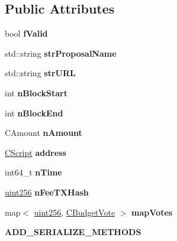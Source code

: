 \subsection*{Public Attributes}
\begin{DoxyCompactItemize}
\item 
\mbox{\label{class_c_budget_proposal_ab2222fd5e4fc51881d82b9c7dc6a0f10}} 
bool {\bfseries f\+Valid}
\item 
\mbox{\label{class_c_budget_proposal_ab881106333b75bf1a8c5c97d56cd6703}} 
std\+::string {\bfseries str\+Proposal\+Name}
\item 
\mbox{\label{class_c_budget_proposal_ac6ff1965ce0dca34221ec041ae831e83}} 
std\+::string {\bfseries str\+U\+RL}
\item 
\mbox{\label{class_c_budget_proposal_a40a5d7e56c5ef1636b48bb67e6619e32}} 
int {\bfseries n\+Block\+Start}
\item 
\mbox{\label{class_c_budget_proposal_a384863d009b95fd48d50f41891e41840}} 
int {\bfseries n\+Block\+End}
\item 
\mbox{\label{class_c_budget_proposal_ad40f0d2ff6c0bef605d405fbcb36136c}} 
C\+Amount {\bfseries n\+Amount}
\item 
\mbox{\label{class_c_budget_proposal_abec3e0b5b46ac1a8aad65b4144b87782}} 
\mbox{\hyperlink{class_c_script}{C\+Script}} {\bfseries address}
\item 
\mbox{\label{class_c_budget_proposal_a73bbfda4189ae03fdecc3d6ddf984a42}} 
int64\+\_\+t {\bfseries n\+Time}
\item 
\mbox{\label{class_c_budget_proposal_aba9937f0c86385b04d0fd5eb136ce999}} 
\mbox{\hyperlink{classuint256}{uint256}} {\bfseries n\+Fee\+T\+X\+Hash}
\item 
\mbox{\label{class_c_budget_proposal_a83239972ab9db545206ac7e59740bfab}} 
map$<$ \mbox{\hyperlink{classuint256}{uint256}}, \mbox{\hyperlink{class_c_budget_vote}{C\+Budget\+Vote}} $>$ {\bfseries map\+Votes}
\item 
\mbox{\label{class_c_budget_proposal_ad35aca18a74a65dd6df2a04536253174}} 
{\bfseries A\+D\+D\+\_\+\+S\+E\+R\+I\+A\+L\+I\+Z\+E\+\_\+\+M\+E\+T\+H\+O\+DS}
\end{DoxyCompactItemize}


